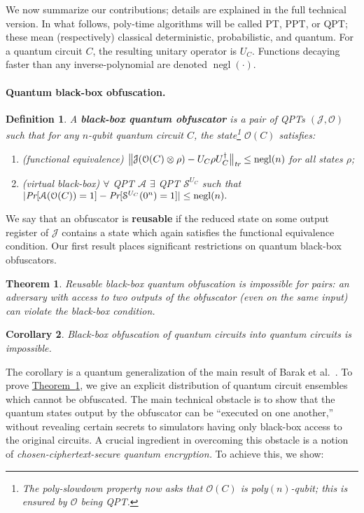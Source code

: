 \documentclass[11pt]{article}
\numberwithin{equation}{section}
\newtheorem{theorem}{Theorem}
\newtheorem{corollary}[theorem]{Corollary}
\newtheorem{definition}{Definition}
\newcommand{\opn}{\operatorname}
\newcommand{\expref}[2]{\texorpdfstring{\hyperref[#2]{#1~\ref{#2}}}{#1~\ref{#2}}}
\newcommand{\algo}{\mathcal}
\newcommand{\negl}{\opn{negl}}
\begin{document}
{We now summarize our contributions; details are explained in the full technical version. In what follows, poly-time algorithms will be called PT, PPT, or QPT; these mean (respectively) classical deterministic, probabilistic, and quantum. For a quantum circuit $C$, the resulting unitary operator is $U_C$. Functions decaying faster than any inverse-polynomial are denoted $\negl(\cdot)$.

\paragraph{Quantum black-box obfuscation.} 

\begin{definition}\label{def:vbb-obfuscator}
A \textbf{black-box quantum obfuscator} is a pair of QPTs $(\algo J, \algo O)$ such that for any $n$-qubit quantum circuit $C$, the state\footnote{The poly-slowdown property now asks that $\mathcal O(C)$ is poly$(n)$-qubit; this is ensured by $\algo O$ being QPT.} $\mathcal O(C)$ satisfies:
\begin{enumerate}
\item (functional equivalence) $\bigl\| \algo J ( \algo O(C) \otimes \rho ) - U_C \rho U_C^\dagger \bigr\|_\emph{tr} \leq \negl(n)$ for all states $\rho$;
\item (virtual black-box) $\forall$ QPT $\mathcal A$ $\exists$ QPT $\mathcal S^{U_C}$ such that
$| \emph{Pr}[\mathcal A(\mathcal O(C)) = 1] - \emph{Pr}[\mathcal S^{U_C}(0^n) = 1]| \leq \negl(n).$
\end{enumerate}
\end{definition}
\noindent We say that an obfuscator is \textbf{reusable} if the reduced state on some output register of $\algo J$ contains a state which again satisfies the functional equivalence condition. Our first result places significant restrictions on quantum black-box obfuscators.

\begin{theorem}\label{thm:main}
Reusable black-box quantum obfuscation is impossible for pairs: an adversary with access to two outputs of the obfuscator (even on the same input) can violate the black-box condition.
\end{theorem}

\begin{corollary}
Black-box obfuscation of quantum circuits into quantum circuits is impossible.
\end{corollary}

\noindent The corollary is a quantum generalization of the main result of Barak et al.~\cite{BGIRSVY01}. To prove \expref{Theorem}{thm:main}, we give an explicit distribution of quantum circuit ensembles which cannot be obfuscated. The main technical obstacle is to show that the quantum states output by the obfuscator can be ``executed on one another,'' without revealing certain secrets to simulators having only black-box access to the original circuits. A crucial ingredient in overcoming this obstacle is a notion of \emph{chosen-ciphertext-secure quantum encryption.} To achieve this, we show:

}
\end{document}
